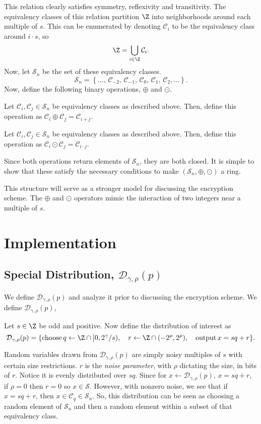 \documentclass[a4paper,11pt, oneside]{article}
\newcommand{\C}[1]{\mathcal{C}_{#1}}
\renewcommand{\D}{\mathcal{D}_{\gamma,\rho}(p)}
\newcommand{\ring}{\mathcal{S}}
\newcommand{\nring}{\mathcal{S}_n}
\begin{document}
This relation clearly satisfies symmetry, reflexivity and transitivity.  The equivalency classes of this relation partition $\Z$ into neighborhoods around each multiple of $s$.  This can be enumerated by denoting $\mathcal{C}_i$ to be the equivalency class around $i\cdot s$, so
\[\Z= \bigcup_{i\in\Z} \C{i}.\]
Now, let $\nring$ be the set of these equivalency classes.  
\[\nring = \left\{\dots,\, \C{-2},\,\C{-1},\,\C{0},\,\C{1},\,\C{2},\dots \right\} .\]
Now, define the following binary operations, $\oplus$ and $\odot$.
\begin{definition}
    Let $\C{i},\C{j}\in\nring$ be equivalency classes as described above.  Then, define this operation as $\C{i} \oplus \C{j} = \C{i+j}$.
\end{definition}

\begin{definition}
    Let $\C{i},\C{j}\in\nring$ be equivalency classes as described above.  Then, define this operation as $\C{i} \odot \C{j} = \C{i\cdot j}$.
\end{definition}

Since both operations return elements of $\nring$, they are both closed.  It is simple to show that these satisfy the necessary conditions to make $\left(\nring, \oplus, \odot\right)$ a ring.

This structure will serve as a stronger model for discussing the encryption scheme.  The $\oplus$ and $\odot$ operators mimic the interaction of two integers near a multiple of $s$.

\section{Implementation}
    \subsection{Special Distribution, $\D$}
    We define $\D$ and analyze it prior to discussing the encryption scheme.  We define $\D$,
\begin{definition}
    Let $s\in\Z$ be odd and positive.  Now define the distribution of interest as
    \[
        \D = \{ \text{choose}\, q\leftarrow\Z\cap[0,2^\gamma/s),\quad r\leftarrow \Z\cap (-2^{\rho}, 2^\rho),\quad\text{output}\, x = sq+r\}.
        \] 
\end{definition}

Random variables drawn from $\D$ are simply noisy multiples of $s$ with certain size restrictions. $r$ is the \emph{noise parameter}, with $\rho$ dictating the size, in bits of $r$.  Notice it is evenly distributed over $sq$.  Since for $x\leftarrow\D$, $x = sq+r$, if $\rho = 0$ then $r = 0$ so $x\in\ring$.  However, with nonzero noise, we see that if $x = sq+r$, then $x\in\C{q}\in\nring$.  So, this distribution can be seen as choosing a random element of $\nring$ and then a random element within a subset of that equivalency class.  
\end{document}
